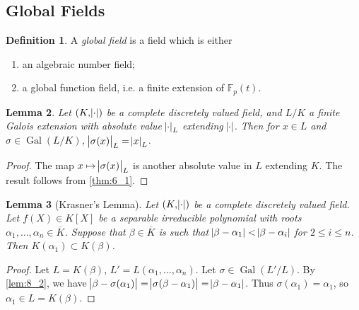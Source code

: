\documentclass[11pt]{article}
\theoremstyle{definition}
\newtheorem{definition}{Definition}[subsection]
\theoremstyle{plain}
\newtheorem{lemma}[definition]{Lemma}
\theoremstyle{remark}
\DeclareMathOperator{\Gal}{Gal}
\newcommand{\FF}{\mathbb{F}}
\begin{document}
\subsection{Global Fields}

\begin{definition}\label{def:8_1}
    A \emph{global field} is a field which is either
    \begin{enumerate}
        \item an algebraic number field;
        \item a global function field, i.e. a finite extension of $\FF_p(t)$.
    \end{enumerate}
\end{definition}

\begin{lemma}\label{lem:8_2}
    Let $(K, \abs{\cdot})$ be a complete discretely valued field, and $L/K$ a finite Galois extension with absolute value $\abs{\cdot}_L$ extending $\abs{\cdot}$. Then for $x \in L$ and $\sigma \in \Gal(L/K)$, $\abs{\sigma(x)}_L = \abs{x}_L$.
\end{lemma}
\begin{proof}
    The map $x \mapsto \abs{\sigma(x)}_L$ is another absolute value in $L$ extending $K$. The result follows from \autoref{thm:6_1}.
\end{proof}

\begin{lemma}[Krasner's Lemma]\label{lem:8_3}
    Let $(K, \abs{\cdot})$ be a complete discretely valued field. Let $f(X) \in K[X]$ be a separable irreducible polynomial with roots $\alpha_1, \ldots, \alpha_n \in \overline{K}$. Suppose that $\beta \in \overline{K}$ is such that $\abs{\beta - \alpha_1} < \abs{\beta - \alpha_i}$ for $2 \le i \le n$. Then $K(\alpha_1) \subset K(\beta)$.
\end{lemma}
\begin{proof}
    Let $L = K(\beta)$, $L' = L(\alpha_1, \ldots, \alpha_n)$. Let $\sigma \in \Gal(L' / L)$. By \autoref{lem:8_2}, we have $\abs{\beta - \sigma(\alpha_1)} = \abs{\sigma(\beta - \alpha_1)} = \abs{\beta - \alpha_1}$. Thus $\sigma(\alpha_1) = \alpha_1$, so $\alpha_1 \in L = K(\beta)$.
\end{proof}
\end{document}
